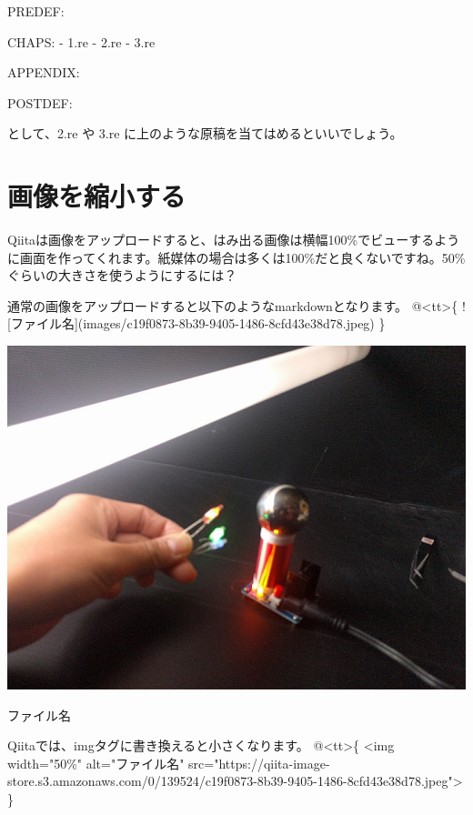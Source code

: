 \begin{reviewemlist}
PREDEF:

CHAPS:
  {-} 1.re
  {-} 2.re
  {-} 3.re

APPENDIX:

POSTDEF:
\end{reviewemlist}

として、2.re や 3.re に上のような原稿を当てはめるといいでしょう。

\section{画像を縮小する}
\label{sec:5-6}

Qiitaは画像をアップロードすると、はみ出る画像は横幅100\%でビューするように画面を作ってくれます。紙媒体の場合は多くは100\%だと良くないですね。50\%ぐらいの大きさを使うようにするには？

通常の画像をアップロードすると以下のようなmarkdownとなります。
@\textless{}tt\textgreater{}\{
![ファイル名](images/c19f0873{-}8b39{-}9405{-}1486{-}8cfd43e38d78.jpeg)
\}

\begin{reviewimage}
\includegraphics[width=\maxwidth]{./images/c19f0873-8b39-9405-1486-8cfd43e38d78.jpeg}
\caption{ファイル名}
\label{image:qiita2review:c19f0873-8b39-9405-1486-8cfd43e38d78}
\end{reviewimage}

Qiitaでは、imgタグに書き換えると小さくなります。
@\textless{}tt\textgreater{}\{
\textless{}img width="50\%" alt="ファイル名" src="https://qiita{-}image{-}store.s3.amazonaws.com/0/139524/c19f0873{-}8b39{-}9405{-}1486{-}8cfd43e38d78.jpeg"\textgreater{}
\}

